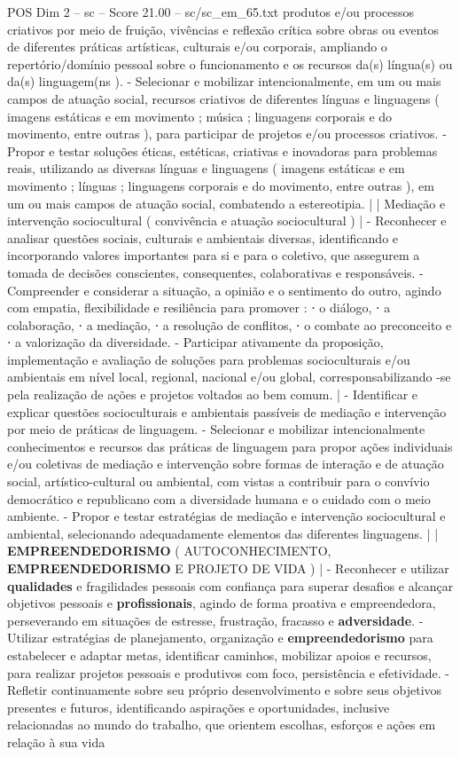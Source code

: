\begin{textsample}{POS Dim 2 – sc – Score 21.00 – sc/sc\_em\_65.txt}
produtos e/ou processos criativos por meio de fruição, vivências e reflexão crítica sobre obras ou eventos de diferentes práticas artísticas, culturais e/ou corporais, ampliando o repertório/domínio pessoal sobre o funcionamento e os recursos da(s) língua(s) ou da(s) linguagem(ns ). - Selecionar e mobilizar intencionalmente, em um ou mais campos de atuação social, recursos criativos de diferentes línguas e linguagens ( imagens estáticas e em movimento ; música ; linguagens corporais e do movimento, entre outras ), para participar de projetos e/ou processos criativos. - Propor e testar soluções éticas, estéticas, criativas e inovadoras para problemas reais, utilizando as diversas línguas e linguagens ( imagens estáticas e em movimento ; línguas ; linguagens corporais e do movimento, entre outras ), em um ou mais campos de atuação social, combatendo a estereotipia. | | Mediação e intervenção sociocultural ( convivência e atuação sociocultural ) | - Reconhecer e analisar questões sociais, culturais e ambientais diversas, identificando e incorporando valores importantes para si e para o coletivo, que assegurem a tomada de decisões conscientes, consequentes, colaborativas e responsáveis. - Compreender e considerar a situação, a opinião e o sentimento do outro, agindo com empatia, flexibilidade e resiliência para promover : ⋅ o diálogo, ⋅ a colaboração, ⋅ a mediação, ⋅ a resolução de conflitos, ⋅ o combate ao preconceito e ⋅ a valorização da diversidade. - Participar ativamente da proposição, implementação e avaliação de soluções para problemas socioculturais e/ou ambientais em nível local, regional, nacional e/ou global, corresponsabilizando -se pela realização de ações e projetos voltados ao bem comum. | - Identificar e explicar questões socioculturais e ambientais passíveis de mediação e intervenção por meio de práticas de linguagem. - Selecionar e mobilizar intencionalmente conhecimentos e recursos das práticas de linguagem para propor ações individuais e/ou coletivas de mediação e intervenção sobre formas de interação e de atuação social, artístico-cultural ou ambiental, com vistas a contribuir para o convívio democrático e republicano com a diversidade humana e o cuidado com o meio ambiente. - Propor e testar estratégias de mediação e intervenção sociocultural e ambiental, selecionando adequadamente elementos das diferentes linguagens. | | \textbf{EMPREENDEDORISMO} ( AUTOCONHECIMENTO, \textbf{EMPREENDEDORISMO} E PROJETO DE VIDA ) | - Reconhecer e utilizar \textbf{qualidades} e fragilidades pessoais com confiança para superar desafios e alcançar objetivos pessoais e \textbf{profissionais}, agindo de forma proativa e empreendedora, perseverando em situações de estresse, frustração, fracasso e \textbf{adversidade}. - Utilizar estratégias de planejamento, organização e \textbf{empreendedorismo} para estabelecer e adaptar metas, identificar caminhos, mobilizar apoios e recursos, para realizar projetos pessoais e produtivos com foco, persistência e efetividade. - Refletir continuamente sobre seu próprio desenvolvimento e sobre seus objetivos presentes e futuros, identificando aspirações e oportunidades, inclusive relacionadas ao mundo do trabalho, que orientem escolhas, esforços e ações em relação à sua vida 
\end{textsample}
